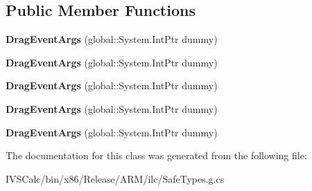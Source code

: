 \subsection*{Public Member Functions}
\begin{DoxyCompactItemize}
\item 
\mbox{\label{class_windows_1_1_u_i_1_1_xaml_1_1_drag_event_args_a88b9c9483032a225f3a3f0e8496646e0}} 
{\bfseries Drag\+Event\+Args} (global\+::\+System.\+Int\+Ptr dummy)
\item 
\mbox{\label{class_windows_1_1_u_i_1_1_xaml_1_1_drag_event_args_a88b9c9483032a225f3a3f0e8496646e0}} 
{\bfseries Drag\+Event\+Args} (global\+::\+System.\+Int\+Ptr dummy)
\item 
\mbox{\label{class_windows_1_1_u_i_1_1_xaml_1_1_drag_event_args_a88b9c9483032a225f3a3f0e8496646e0}} 
{\bfseries Drag\+Event\+Args} (global\+::\+System.\+Int\+Ptr dummy)
\item 
\mbox{\label{class_windows_1_1_u_i_1_1_xaml_1_1_drag_event_args_a88b9c9483032a225f3a3f0e8496646e0}} 
{\bfseries Drag\+Event\+Args} (global\+::\+System.\+Int\+Ptr dummy)
\item 
\mbox{\label{class_windows_1_1_u_i_1_1_xaml_1_1_drag_event_args_a88b9c9483032a225f3a3f0e8496646e0}} 
{\bfseries Drag\+Event\+Args} (global\+::\+System.\+Int\+Ptr dummy)
\end{DoxyCompactItemize}


The documentation for this class was generated from the following file\+:\begin{DoxyCompactItemize}
\item 
I\+V\+S\+Calc/bin/x86/\+Release/\+A\+R\+M/ilc/Safe\+Types.\+g.\+cs\end{DoxyCompactItemize}
